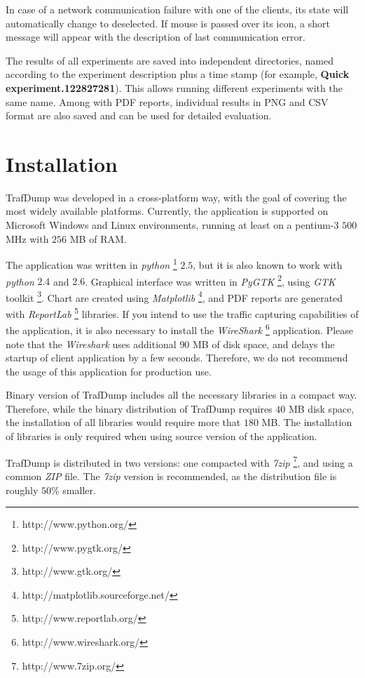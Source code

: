 \documentclass[12pt]{report}
\begin{document}
In case of a network communication failure with one of the clients, its
state will automatically change to deselected. If mouse is passed over its
icon, a short message will appear with the description of last communication error.

The results of all experiments are saved into independent directories, named
according to the experiment description plus a time stamp (for example,
\textbf{Quick experiment.122827281}). This allows running different
experiments with the same name. Among with PDF reports, individual results
in PNG and CSV format are also saved and can be used for detailed
evaluation.

\chapter{Installation}

TrafDump was developed in a cross-platform way, with the goal of covering
the most widely available platforms. Currently, the application is supported
on Microsoft Windows and Linux environments, running at least on a pentium-3
$500$ MHz with $256$ MB of RAM.

The application was written in \emph{python}
\footnote{http://www.python.org/} $2.5$, but it is also known to work with
\emph{python} $2.4$ and $2.6$. Graphical interface was written in
\emph{PyGTK} \footnote{http://www.pygtk.org/}, using \emph{GTK} toolkit
\footnote{http://www.gtk.org/}. Chart are created using \emph{Matplotlib}
\footnote{http://matplotlib.sourceforge.net/}, and PDF reports are generated
with \emph{ReportLab} \footnote{http://www.reportlab.org/} libraries. If you
intend to use the traffic capturing capabilities of the application, it is
also necessary to install the \emph{WireShark}
\footnote{http://www.wireshark.org/} application. Please note that the
\emph{Wireshark} uses additional $90$ MB of disk space, and delays the
startup of client application by a few seconds. Therefore, we do not
recommend the usage of this application for production use.

Binary version of TrafDump includes all the necessary libraries in a compact
way. Therefore, while the binary distribution of TrafDump requires $40$ MB
disk space, the installation of all libraries would require more that $180$
MB. The installation of libraries is only required when using source version
of the application.

TrafDump is distributed in two versions: one compacted with \emph{7zip}
\footnote{http://www.7zip.org/}, and using a common \emph{ZIP} file. The
\emph{7zip} version is recommended, as the distribution file is roughly
$50\%$ smaller.
\end{document}
